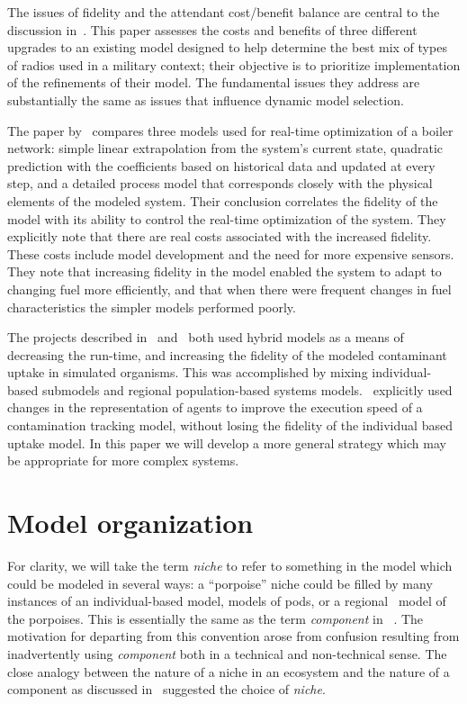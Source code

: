 The issues of fidelity and the attendant cost/benefit balance are
central to the dis\-cus\-sion in~\cite{bailey1992scientific}.  This paper
assesses the costs and benefits of three dif\-fer\-ent upgrades to an
existing model designed to help de\-ter\-mine the best mix of types of
radios used in a mil\-i\-tary con\-text; their ob\-jec\-tive is to prioritize
im\-ple\-men\-ta\-tion of the refinements of their model. The fun\-da\-men\-tal
issues they address are substantially the same as issues that
in\-flu\-ence dynamic model selection.

The paper by~\cite{yip2004effect} compares three models used for
real-time optimization of a boiler network: simple linear
extrapolation from the system's current state, quadratic prediction
with the coefficients based on historical data and updated at every
step, and a detailed process model that corresponds closely with the
physical elements of the modeled system. Their conclusion correlates
the fidelity of the model with its ability to control the real-time
optimization of the system. They explicitly note that there are real
costs associated with the increased fidelity. These costs include
model development and the need for more expensive sensors. They note
that increasing fidelity in the model enabled the system to adapt to
changing fuel more efficiently, and that when there were frequent
changes in fuel characteristics the simpler models performed poorly.

The projects described in~\cite{Little2006nws} and~\cite{Fulton2011ningaloo}
both used hybrid models as a means of decreasing the run-time, and
increasing the fidelity of the modeled contaminant uptake in 
simulated organisms. This was accomplished by mixing in\-di\-vidu\-al-based
sub\-models and regional population-based systems
models.~\cite{gray2012adaptive} explicitly used changes in the rep\-re\-sentation
of agents to improve the execution speed of a contamination tracking
model, without losing the fidelity of the in\-di\-vidu\-al based uptake
model. In this paper we will develop a more general strategy which may
be appropriate for more complex systems.


\section{Model organization}

For clarity, we will take the term \emph{niche} to refer to something
in the model which could be modeled in several ways: a ``porpoise''
niche could be filled by many instances of an in\-di\-vidu\-al-based
model, models of pods, or a regional \SD\ model of the porpoises.
This is essentially the same as the term \emph{component} in~
\cite{vincenot2011theoretical}. The motivation for departing from this
convention arose from confusion resulting from inadvertently using
\emph{component} both in a technical and non-technical sense.  The
close analogy between the nature of a niche in an ecosystem and the
nature of a component as discussed in~\cite{vincenot2011theoretical}
suggested the choice of \emph{niche}. 

